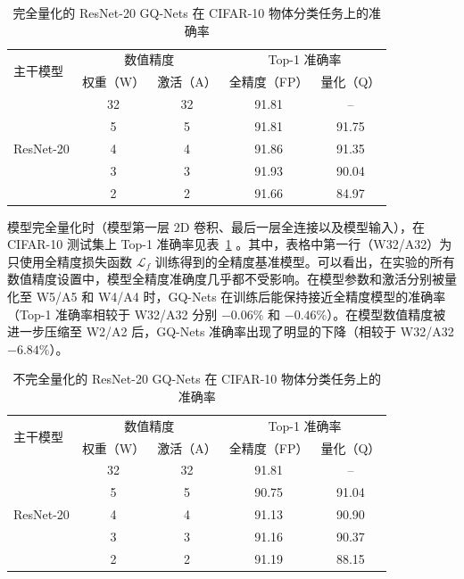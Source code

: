 \documentclass[
  fontset = mac,
]{shtthesis}
\begin{document}
\begin{table}[htb]
  \centering
  \caption{完全量化的 ResNet-20 GQ-Nets 在 CIFAR-10 物体分类任务上的准确率}
  \label{tab::gq_nets::cifar}
  \begin{tabular}{l *{4}{c}}
    \toprule
    \multirow{2}{*}{主干模型} & \multicolumn{2}{c}{数值精度} &\multicolumn{2}{c}{Top-1 准确率} \\
    & 权重（W） & 激活（A） & 全精度（FP） & 量化（Q） \\
    \midrule
    \multirow{5}{*}{ResNet-20} & 32 & 32 & 91.81 & -- \\
    & 5 & 5 & 91.81 & 91.75 \\
    & 4 & 4 & 91.86 & 91.35 \\
    & 3 & 3 & 91.93 & 90.04 \\
    & 2 & 2 & 91.66 & 84.97 \\
    \bottomrule
  \end{tabular}
\end{table}

模型完全量化时（模型第一层 2D 卷积、最后一层全连接以及模型输入），在 CIFAR-10 测试集上 Top-1 准确率见表~\ref{tab::gq_nets::cifar} 。其中，表格中第一行（W32/A32）为只使用全精度损失函数 $\mathcal{L}_f$ 训练得到的全精度基准模型。可以看出，在实验的所有数值精度设置中，模型全精度准确度几乎都不受影响。在模型参数和激活分别被量化至 W5/A5 和 W4/A4 时，GQ-Nets 在训练后能保持接近全精度模型的准确率（Top-1 准确率相较于 W32/A32 分别 $-0.06\%$ 和 $-0.46\%$）。在模型数值精度被进一步压缩至 W2/A2 后，GQ-Nets 准确率出现了明显的下降（相较于 W32/A32 $-6.84\%$）。

\begin{table}[htb]
  \centering
  \caption{不完全量化的 ResNet-20 GQ-Nets 在 CIFAR-10 物体分类任务上的准确率}
  \label{tab::gq_nets::cifar_fpfl}
  \begin{tabular}{l *{4}{c}}
    \toprule
    \multirow{2}{*}{主干模型} & \multicolumn{2}{c}{数值精度} &\multicolumn{2}{c}{Top-1 准确率} \\
    & 权重（W） & 激活（A） & 全精度（FP） & 量化（Q） \\
    \midrule
    \multirow{5}{*}{ResNet-20} & 32 & 32 & 91.81 & -- \\
    & 5 & 5 & 90.75 & 91.04 \\
    & 4 & 4 & 91.13 & 90.90 \\
    & 3 & 3 & 91.16 & 90.37 \\
    & 2 & 2 & 91.19 & 88.15 \\
    \bottomrule
  \end{tabular}
\end{table}
\end{document}
